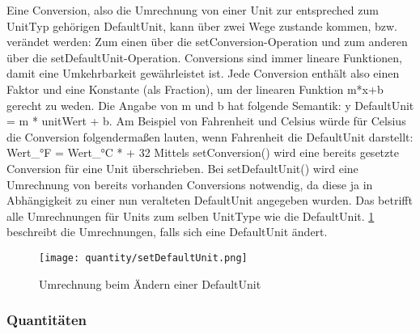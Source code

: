  \newline
\label{ConversionsKapitel} 
Eine Conversion, also die Umrechnung von einer Unit zur entspreched zum UnitTyp gehörigen DefaultUnit, kann über zwei Wege zustande kommen, bzw. verändet werden: Zum einen über die setConversion-Operation und zum anderen über die setDefaultUnit-Operation.
Conversions sind immer lineare Funktionen, damit eine Umkehrbarkeit gewährleistet ist. Jede Conversion enthält also einen Faktor und eine Konstante (als Fraction), um der linearen Funktion m*x+b gerecht zu weden. Die Angabe von m und b hat folgende Semantik: y DefaultUnit = m * unitWert + b.
Am Beispiel von Fahrenheit und Celsius würde für Celsius die Conversion folgendermaßen lauten, wenn Fahrenheit die DefaultUnit darstellt:
Wert_{°F} = Wert_{°C} *  + 32
Mittels setConversion() wird eine bereits gesetzte Conversion für eine Unit überschrieben.
Bei setDefaultUnit() wird eine Umrechnung von bereits vorhanden Conversions notwendig, da diese ja in Abhängigkeit zu einer nun veralteten DefaultUnit angegeben wurden. Das betrifft alle Umrechnungen für Units zum selben UnitType wie die DefaultUnit.
\ref{setDefaultUnitGrafik} beschreibt die Umrechnungen, falls sich eine DefaultUnit ändert.
\begin{figure}[setDefaultUnit]
	\texttt{[image: quantity/setDefaultUnit.png]}
	\label{setDefaultUnitGrafik}
	\caption{Umrechnung beim Ändern einer DefaultUnit}
\end{figure}

\subsubsection{Quantitäten} \newline